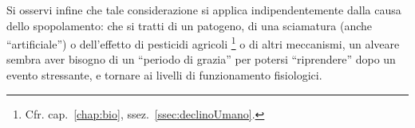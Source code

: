 Si osservi infine che tale considerazione si applica indipendentemente dalla causa dello spopolamento: che si tratti
di un patogeno, di una sciamatura (anche ``artificiale'') o dell'effetto di pesticidi agricoli%
\footnote{Cfr. cap.~\ref{chap:bio}, ssez.~\ref{ssec:declinoUmano}.}
o di altri meccanismi, un alveare sembra aver bisogno di un ``periodo di grazia'' per potersi ``riprendere'' dopo un evento
stressante, e tornare ai livelli di funzionamento fisiologici.


